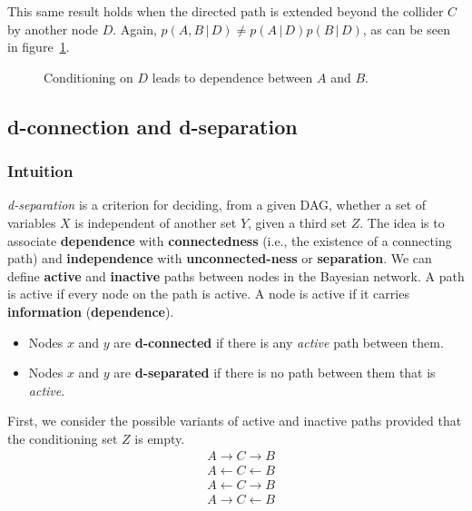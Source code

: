 \documentclass{article}
\begin{document}
\noindent This same result holds when the directed path is extended beyond the collider $C$ by another node $D$. Again, $p(A, B \,|\, D) \neq p(A\,|\,D)p(B\,|\,D)$, as can be seen in figure~\ref{fig:condD}.

\begin{figure}[H]
    \centering
    \caption{Conditioning on $D$ leads to dependence between $A$ and $B$.}
    \label{fig:condD}
\end{figure}

\subsection{d-connection and d-separation}

\subsubsection{Intuition}

\textit{d-separation} is a criterion for deciding, from a given DAG, whether a set of variables $X$ is independent of another set $Y$, given a third set $Z$. The idea is to associate \textbf{dependence} with \textbf{connectedness} (i.e., the existence of a connecting path) and \textbf{independence} with \textbf{unconnected-ness} or \textbf{separation}. We can define \textbf{active} and \textbf{inactive} paths between nodes in the Bayesian network. A path is active if every node on the path is active. A node is active if it carries \textbf{information} (\textbf{dependence}).  
\begin{itemize}
    \item[] Nodes $x$ and $y$ are \textbf{d-connected} if there is any \textit{active} path between them.
    \item[] Nodes $x$ and $y$ are \textbf{d-separated} if there is no path between them that is \textit{active}.
\end{itemize}
\noindent First, we consider the possible variants of active and inactive paths provided that the conditioning set $Z$ is empty. 
\begin{align}
    & A \rightarrow C \rightarrow B \\
    & A \leftarrow C \leftarrow B \\
    & A \leftarrow C \rightarrow B \\
    & A \rightarrow C \leftarrow B
\end{align}
\end{document}

